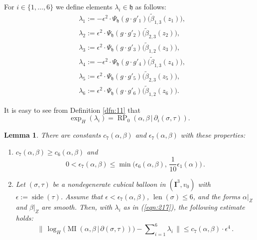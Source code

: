 \documentclass[10pt, a4paper]{amsart}
\newtheorem{lem}[equation]{Lemma}
\theoremstyle{definition}
\numberwithin{equation}{section}
\newcommand{\opn}{\operatorname}
\newcommand{\rmitem}[1]{\item[\text{\textup{(#1)}}]}
\newcommand{\mfrak}[1]{\mathfrak{#1}}
\newcommand{\mbf}[1]{\mathbf{#1}}
\newcommand{\smfrac}[2]{{\textstyle \frac{#1}{#2}}}
\newcommand{\tup}[1]{\textup{#1}}
\newcommand{\bosum}{\sum\nolimits}
\newcommand{\til}[1]{\tilde{#1}}
\newcommand{\Norm}[1]{\bigl\lVert\, #1 \, \bigr\rVert}
\renewcommand{\vert}{\, | \,}
\newcommand{\h}{\mfrak{h}}
\begin{document}
For $i \in \{ 1, \ldots, 6 \}$ we define elements $\lambda_i \in \h$ as
follows:
\begin{equation} \label{eqn:217}
\begin{aligned}
& \lambda_1 := - \epsilon^2 \cdot \Psi_{\h}(g \cdot g'_1)
\bigl( \til{\beta}_{1, 3}(z_1) \bigr) , \\
& \lambda_2 := \epsilon^2 \cdot \Psi_{\h}(g \cdot g'_2)
\bigl( \til{\beta}_{2, 3}(z_2) \bigr) , \\
& \lambda_3 := \epsilon^2 \cdot \Psi_{\h}(g \cdot g'_3)
\bigl( \til{\beta}_{1, 2}(z_3) \bigr) , \\
& \lambda_4 := - \epsilon^2 \cdot \Psi_{\h}(g \cdot g'_4)
\bigl( \til{\beta}_{1, 3}(z_4) \bigr) , \\
&  \lambda_5 := \epsilon^2 \cdot \Psi_{\h}(g \cdot g'_5)
\bigl( \til{\beta}_{2, 3}(z_5) \bigr) , \\
& \lambda_6 :=  \epsilon^2 \cdot \Psi_{\h}(g \cdot g'_6)
\bigl( \til{\beta}_{1, 2}(z_6) \bigr) .
%
\end{aligned}
\end{equation}

It is easy to see from Definition \ref{dfn:11} that
\begin{equation} \label{eqn:198}
\exp_H(\lambda_i) = 
\opn{RP}_0(\alpha, \beta \vert \partial_i(\sigma, \tau)) .
\end{equation}

\begin{lem} \label{lem:27}
There are constants $c_7(\alpha, \beta)$ and
$\epsilon_7(\alpha, \beta)$ with these properties:
\begin{enumerate}
\rmitem{i} $c_7(\alpha, \beta) \geq c_6(\alpha, \beta)$ and
\[ 0 < \epsilon_7(\alpha, \beta) \leq 
\min \bigl( \epsilon_6(\alpha, \beta), \, 
\smfrac{1}{10} \epsilon_1(\alpha) \bigr) \, . \]
\rmitem{ii} Let $(\sigma, \tau)$ be a nondegenerate cubical balloon in
$(\mbf{I}^3, v_0)$ with $\epsilon := \opn{side}(\tau)$. Assume that 
$\epsilon < \epsilon_7(\alpha, \beta)$,
$\opn{len}(\sigma) \leq 6$,
and the forms $\alpha|_Z$ and $\beta|_Z$ are smooth.
Then, with $\lambda_i$ as in \tup{(\ref{eqn:217})}, the following estimate
holds:
\[ \Norm{ \log_H \bigl( \opn{MI}(\alpha, \beta \vert 
\partial(\sigma, \tau)) \bigr)
- \bosum_{i = 1}^6 \lambda_i }
\leq c_7(\alpha, \beta)  \cdot \epsilon^4 \, . \]
\end{enumerate}
\end{lem}
\end{document}
